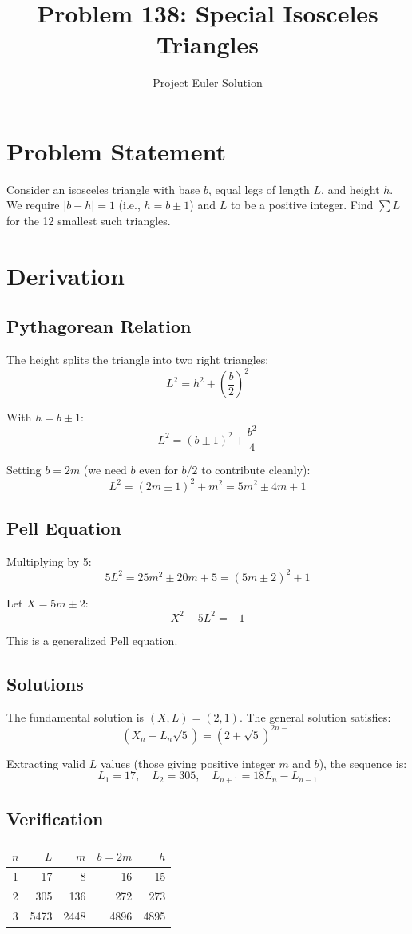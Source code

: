 \documentclass[12pt]{article}
\title{Problem 138: Special Isosceles Triangles}
\author{Project Euler Solution}
\date{}
\begin{document}
\maketitle

\section{Problem Statement}
Consider an isosceles triangle with base $b$, equal legs of length $L$, and height $h$.
We require $|b - h| = 1$ (i.e., $h = b \pm 1$) and $L$ to be a positive integer.
Find $\sum L$ for the 12 smallest such triangles.

\section{Derivation}

\subsection{Pythagorean Relation}
The height splits the triangle into two right triangles:
\[
L^2 = h^2 + \left(\frac{b}{2}\right)^2
\]

With $h = b \pm 1$:
\[
L^2 = (b \pm 1)^2 + \frac{b^2}{4}
\]

Setting $b = 2m$ (we need $b$ even for $b/2$ to contribute cleanly):
\[
L^2 = (2m \pm 1)^2 + m^2 = 5m^2 \pm 4m + 1
\]

\subsection{Pell Equation}
Multiplying by 5:
\[
5L^2 = 25m^2 \pm 20m + 5 = (5m \pm 2)^2 + 1
\]

Let $X = 5m \pm 2$:
\[
X^2 - 5L^2 = -1
\]

This is a generalized Pell equation.

\subsection{Solutions}
The fundamental solution is $(X, L) = (2, 1)$. The general solution satisfies:
\[
(X_n + L_n\sqrt{5}) = (2 + \sqrt{5})^{2n-1}
\]

Extracting valid $L$ values (those giving positive integer $m$ and $b$), the sequence is:
\[
L_1 = 17, \quad L_2 = 305, \quad L_{n+1} = 18L_n - L_{n-1}
\]

\subsection{Verification}
\begin{center}
\begin{tabular}{c|r|r|r|r}
$n$ & $L$ & $m$ & $b = 2m$ & $h$ \\ \hline
1 & 17 & 8 & 16 & 15 \\
2 & 305 & 136 & 272 & 273 \\
3 & 5473 & 2448 & 4896 & 4895 \\
\end{tabular}
\end{center}
\end{document}
